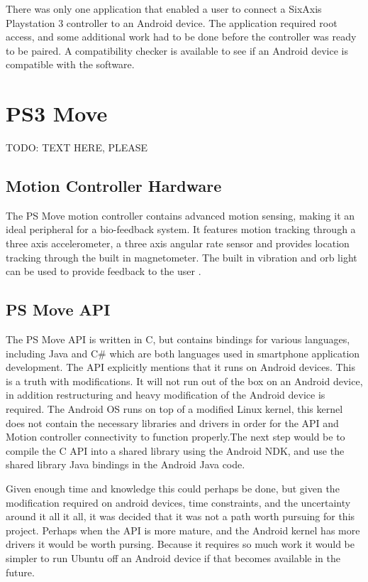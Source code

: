 There was only one application\cite{sixaxisController} that enabled a user to connect a SixAxis Playstation 3 controller to an Android device. The application required root access, and some additional work had to be done before the controller was ready to be paired. A compatibility checker is available to see if an Android device is compatible with the software.

\section{PS3 Move}
TODO: TEXT HERE, PLEASE

\subsection{Motion Controller Hardware}
The PS Move motion controller contains advanced motion sensing, making it an ideal peripheral for a bio-feedback system. It features motion tracking through a three axis accelerometer, a three axis angular rate sensor and provides location tracking through the built in magnetometer. The built in vibration and orb light can be used to provide feedback to the user \cite{psMoveTech}.

\subsection{PS Move API}
The PS Move API \cite{PSMoveAPI} is written in C, but contains bindings for various languages, including Java and C\# which are both languages used in smartphone application development. The API explicitly mentions that it runs on Android devices. This is a truth with modifications. It will not run out of the box on an Android device, in addition restructuring and heavy modification of the Android device is required. The Android OS runs on top of a modified Linux kernel, this kernel does not contain the necessary libraries and drivers in order for the API and Motion controller connectivity to function properly.The next step would be to compile the C API into a shared library using the Android NDK, and use the shared library Java bindings in the Android Java code.

Given enough time and knowledge this could perhaps be done, but given the modification required on android devices, time constraints, and the uncertainty around it all it all, it was decided that it was not a path worth pursuing for this project. Perhaps when the API is more mature, and the Android kernel has more drivers it would be worth pursing. Because it requires so much work it would be simpler to run Ubuntu off an Android device if that becomes available in the future. \cite{ubuntuAndroid}

